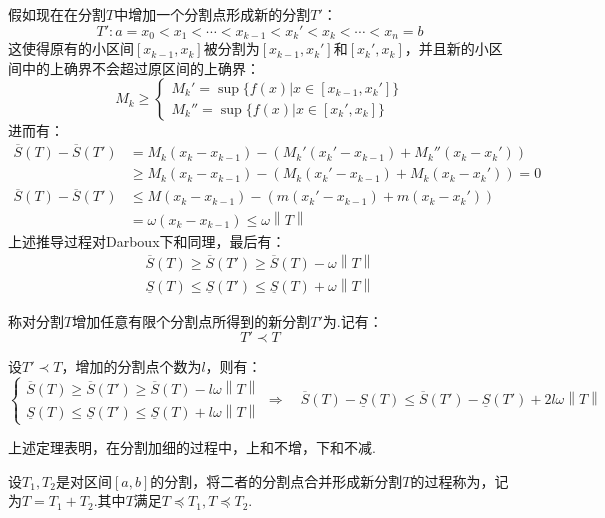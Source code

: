假如现在在分割$T$中增加一个分割点形成新的分割$T'$：
\[T': a=x_0<x_1<\cdots<x_{k-1}<x_k'<x_k<\cdots<x_n=b\]
这使得原有的小区间$[x_{k-1},x_k]$被分割为$[x_{k-1},x_k']$和$[x_k',x_k]$，并且新的小区间中的上确界不会超过原区间的上确界：
\[M_k\geqslant\begin{cases}
    M_k' = \sup\{f(x)|x\in[x_{k-1},x_k']\}\\
    M_k'' = \sup\{f(x)|x\in[x_k',x_k]\}
\end{cases}\]
进而有：
\begin{align*}
    \overline{S}(T) - \overline{S}(T') &= M_k(x_k-x_{k-1})-(M_k'(x_k'-x_{k-1}) + M_k''(x_k-x_k'))\\
    &\geqslant M_k(x_k-x_{k-1})-(M_k(x_k'-x_{k-1}) + M_k(x_k-x_k')) = 0\\
    \overline{S}(T) - \overline{S}(T') &\leqslant M(x_k-x_{k-1})-(m(x_k'-x_{k-1}) + m(x_k-x_k'))\\
    &= \omega(x_k-x_{k-1}) \leqslant \omega\left\|T\right\|
\end{align*}
上述推导过程对Darboux下和同理，最后有：
\begin{gather*}
    \overline{S}(T)\geqslant\overline{S}(T')\geqslant\overline{S}(T) - \omega\left\|T\right\|\\
    \underline{S}(T)\leqslant\underline{S}(T')\leqslant\underline{S}(T) + \omega\left\|T\right\|
\end{gather*}

\begin{definition}
    称对分割$T$增加任意有限个分割点所得到的新分割$T'$为.记有：
    \[T' \prec T\]

\end{definition}

\begin{theorem}
    设$T' \prec T$，增加的分割点个数为$l$，则有：
    \[\begin{cases}
    \overline{S}(T)\geqslant\overline{S}(T')\geqslant\overline{S}(T) - l\omega\left\|T\right\|\\
    \underline{S}(T)\leqslant\underline{S}(T')\leqslant\underline{S}(T) + l\omega\left\|T\right\|
    \end{cases} \Rightarrow\quad \overline{S}(T) - \underline{S}(T) \leqslant \overline{S}(T') - \underline{S}(T') + 2l\omega\left\|T\right\|\]
\end{theorem}

上述定理表明，在分割加细的过程中，上和不增，下和不减.

\begin{definition}
    设$T_1,T_2$是对区间$[a,b]$的分割，将二者的分割点合并形成新分割$T$的过程称为，记为$T = T_1 + T_2$.其中$T$满足$T \preceq T_1,T \preceq T_2$.
\end{definition}

